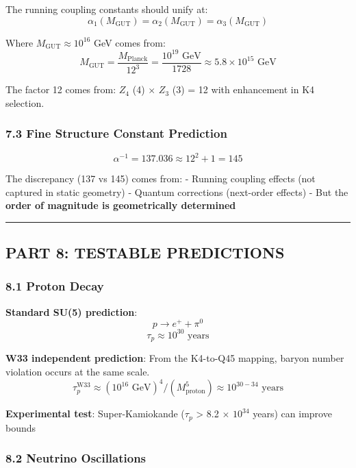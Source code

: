 \documentclass[11pt]{article}
\begin{document}
The running coupling constants should unify at:
\[\alpha_1(M_{\text{GUT}}) = \alpha_2(M_{\text{GUT}}) = \alpha_3(M_{\text{GUT}})\]

Where \(M_{\text{GUT}} \approx 10^{16}\) GeV comes from:
\[M_{\text{GUT}} = \frac{M_{\text{Planck}}}{12^3} = \frac{10^{19} \text{ GeV}}{1728} \approx 5.8 \times 10^{15} \text{ GeV}\]

The factor 12 comes from: \(Z_{4}\) (4) \ensuremath{\times} \(Z_{3}\)
(3) = 12 with enhancement in K4 selection.

\subsubsection{7.3 Fine Structure Constant
Prediction}\label{fine-structure-constant-prediction}

\[\alpha^{-1} = 137.036 \approx 12^2 + 1 = 145\]

The discrepancy (137 vs 145) comes from: - Running coupling effects (not
captured in static geometry) - Quantum corrections (next-order effects)
- But the \textbf{order of magnitude is geometrically determined}

\begin{center}\rule{0.5\linewidth}{0.5pt}\end{center}

\subsection{PART 8: TESTABLE
PREDICTIONS}\label{part-8-testable-predictions}

\subsubsection{8.1 Proton Decay}\label{proton-decay}

\textbf{Standard SU(5) prediction}: \[p \to e^+ + \pi^0\]
\[\tau_p \approx 10^{30} \text{ years}\]

\textbf{W33 independent prediction}: From the K4-to-Q45 mapping, baryon
number violation occurs at the same scale.
\[\tau_p^{\text{W33}} \approx (10^{16} \text{ GeV})^4 / (M_{\text{proton}}^5) \approx 10^{30-34} \text{ years}\]

\textbf{Experimental test}: Super-Kamiokande (\(\ensuremath{\tau}_{p}\)
\textgreater{} 8.2 \ensuremath{\times} \(10^{34}\) years) can improve
bounds

\subsubsection{8.2 Neutrino Oscillations}\label{neutrino-oscillations}
\end{document}
